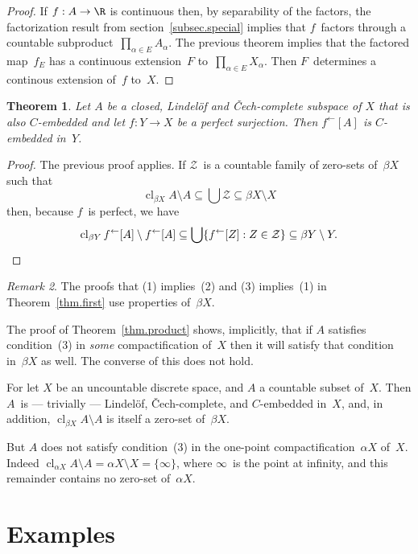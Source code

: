 \documentclass[a4paper]{amsart}
\newcommand\calZ{\mathcal{Z}}
\newcommand\cl{\operatorname{cl}}
\newcommand\clbeta[1][X]{\cl_{\beta #1}}
\newcommand\preim{^\gets}
\theoremstyle{plain}
\newtheorem{theorem}{Theorem}[section]
\theoremstyle{definition}
\theoremstyle{remark}
\newtheorem{remark}[theorem]{Remark}
\begin{document}
\begin{proof}
If $f:A\to\R$ is continuous then, by separability of the factors,
the factorization result from section~\ref{subsec.special} 
implies that $f$~factors through a countable 
subproduct~$\prod_{\alpha\in E}A_\alpha$.
The previous theorem implies that the factored map~$f_E$ has a continuous
extension~$F$ to~$\prod_{\alpha\in E}X_\alpha$.
Then $F$~determines a continous extension of~$f$ to~$X$.
\end{proof}

\begin{theorem}\label{thm.preim}
Let $A$ be a closed, Lindel\"of and \v{C}ech-complete subspace of $X$ 
that is also $C$-embedded and let $f:Y\to X$ be a perfect surjection.
Then $f\preim[A]$ is $C$-embedded in~$Y$.
\end{theorem}
\begin{proof}
The previous proof applies.
If $\calZ$~is a countable family of zero-sets of~$\beta X$ such that
$$
\clbeta A\setminus A\subseteq\bigcup\calZ\subseteq\beta X\setminus X
$$
then, because $f$~is perfect, we have
$$
\clbeta[Y] f\preim[A]\setminus f\preim[A]\subseteq
\bigcup\{f\preim[Z]:Z\in\calZ\}\subseteq\beta Y\setminus Y.\qedhere
$$ 
\end{proof}
\begin{remark}
The proofs that (1) implies~(2) and (3) implies~(1) in Theorem~\ref{thm.first}
use properties of~$\beta X$.

The proof of Theorem~\ref{thm.product} shows, implicitly, that if $A$ satisfies
condition~(3) in \emph{some} compactification of~$X$ then it will satisfy
that condition in~$\beta X$ as well.
The converse of this does not hold.

For let $X$ be an uncountable discrete space, and $A$ a countable subset 
of~$X$.
Then $A$~is --- trivially --- Lindel\"of, \v{C}ech-complete, and $C$-embedded 
in~$X$, and, in addition, $\clbeta A\setminus A$ is itself a zero-set 
of~$\beta X$.

But $A$ does not satisfy condition~(3) in the one-point 
compactification~$\alpha X$ of~$X$.
Indeed $\cl_{\alpha X}A\setminus A=\alpha X\setminus X=\{\infty\}$, where 
$\infty$~is the point at infinity, and this remainder contains no zero-set
of~$\alpha X$.
\end{remark}



\section{Examples}
\label{sec.examples}
\end{document}
